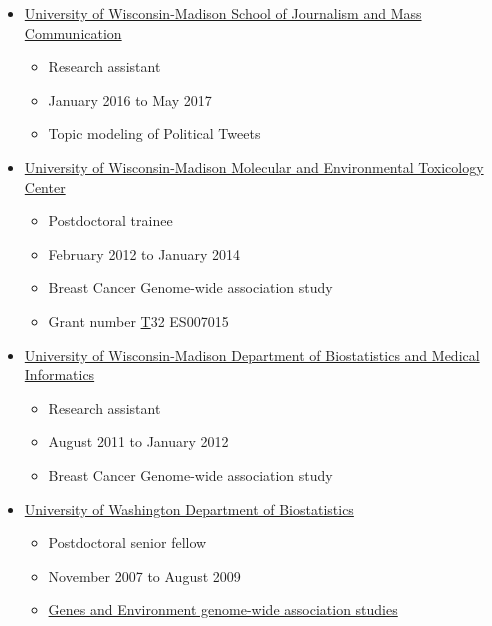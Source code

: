 \begin{itemize}
\item \href{https://journalism.wisc.edu}{University of Wisconsin-Madison School of Journalism and Mass Communication}
  \begin{itemize}
    \item Research assistant
    \item January 2016 to May 2017
    \item Topic modeling of Political Tweets
  \end{itemize}
  
  \item \href{http://metc.med.wisc.edu/metc/}{University of Wisconsin-Madison Molecular and Environmental Toxicology Center}
  \begin{itemize}
    \item Postdoctoral trainee    
    \item February 2012 to January 2014    
    \item Breast Cancer Genome-wide association study     
    \item Grant number \href{http://projectreporter.nih.gov/project_info_description.cfm?aid=8475145&icde=18718031&ddparam=&ddvalue=&ddsub=&cr=3&csb=default&cs=ASC} T32 ES007015 
  \end{itemize}


  \item \href{http://www.biostat.wisc.edu}{University of Wisconsin-Madison Department of Biostatistics and Medical Informatics}
  \begin{itemize}
    \item Research assistant
    \item August 2011 to January 2012
    \item Breast Cancer Genome-wide association study     
  \end{itemize}

  \item \href{http://www.biostat.washington.edu}{University of Washington Department of Biostatistics}
  \begin{itemize}
    \item Postdoctoral senior fellow  
    \item November 2007 to August 2009    
    \item \href{https://www.genome.gov/27541319/Gene-Environment-Association-Studes-GENEVA}{Genes and Environment genome-wide association studies}     
  \end{itemize}


\end{itemize}
